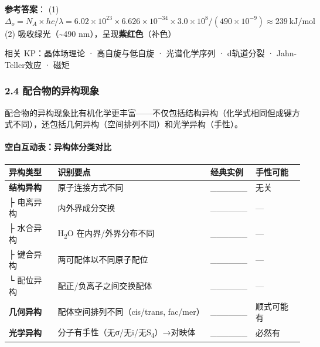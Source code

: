 \documentclass[a4paper,11pt]{ctexart}
\newcounter{none}
\begin{document}
\textbf{参考答案}：
(1) \(\Delta_o = N_A \times hc / \lambda = 6.02\times10^{23} \times 6.626\times10^{-34} \times 3.0\times10^8 / (490\times10^{-9}) \approx 239\ \mathrm{kJ/mol}\)
(2) 吸收绿光（\textasciitilde490 nm），呈现\textbf{紫红色}（补色）

相关 KP：晶体场理论 · 高自旋与低自旋 · 光谱化学序列 · d轨道分裂 · Jahn-Teller效应 · 磁矩

\subsubsection{2.4 配合物的异构现象}\label{ux914dux5408ux7269ux7684ux5f02ux6784ux73b0ux8c61}

配合物的异构现象比有机化学更丰富------不仅包括结构异构（化学式相同但成键方式不同），还包括几何异构（空间排列不同）和光学异构（手性）。

\paragraph{空白互动表：异构体分类对比}\label{ux7a7aux767dux4e92ux52a8ux8868ux5f02ux6784ux4f53ux5206ux7c7bux5bf9ux6bd4}

{\def\LTcaptype{none} %
\begin{longtable}[]{@{}
  >{\centering\arraybackslash}p{}
  >{\raggedright\arraybackslash}p{}
  >{\raggedright\arraybackslash}p{}
  >{\centering\arraybackslash}p{}@{}}
\toprule\noalign{}
\begin{minipage}[b]{\linewidth}\centering
异构类型
\end{minipage} & \begin{minipage}[b]{\linewidth}\raggedright
识别要点
\end{minipage} & \begin{minipage}[b]{\linewidth}\raggedright
经典实例
\end{minipage} & \begin{minipage}[b]{\linewidth}\centering
手性可能
\end{minipage} \\
\midrule\noalign{}
\endhead
\bottomrule\noalign{}
\endlastfoot
\textbf{结构异构} & 原子连接方式不同 & \_\_\_\_\_\_ & 无关 \\
├ 电离异构 & 内外界成分交换 & \_\_\_\_\_\_ & --- \\
├ 水合异构 & H\textsubscript{2}O 在内界/外界分布不同 & \_\_\_\_\_\_ & --- \\
├ 键合异构 & 两可配体以不同原子配位 & \_\_\_\_\_\_ & --- \\
└ 配位异构 & 配正/负离子之间交换配体 & \_\_\_\_\_\_ & --- \\
\textbf{几何异构} & 配体空间排列不同（cis/trans, fac/mer） & \_\_\_\_\_\_ & 顺式可能有 \\
\textbf{光学异构} & 分子有手性（无σ/无i/无S\textsubscript{4}）→对映体 & \_\_\_\_\_\_ & 必然有 \\
\end{longtable}
}
\end{document}
